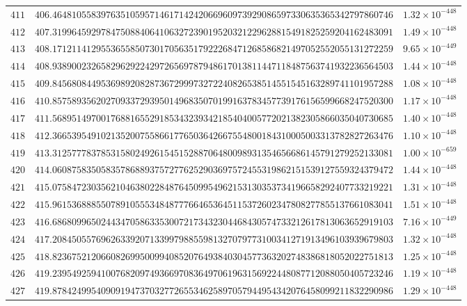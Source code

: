 \documentclass[12pt,reqno]{amsart}
\theoremstyle{remark}
\begin{document}
\begin{longtable}{clc}
$411$ & $406.4648105583976351059571461714242066960973929086597330635365342797860746$ & $1.32\times 10^{-448}$ \\
$412$ & $407.3199645929784750884064106327239019520321229628815491825259204162483091$ & $1.49\times 10^{-448}$ \\
$413$ & $408.1712114129553655850730170563517922268471268586821497052552055131272259$ & $9.65\times 10^{-449}$ \\
$414$ & $408.9389002326582962922429726569787948617013811447118487563741932236564503$ & $1.44\times 10^{-448}$ \\
$415$ & $409.8456808449536989208287367299973272240826538514551545163289741101957288$ & $1.08\times 10^{-448}$ \\
$416$ & $410.8575893562027093372939501496835070199163783457739176156599668247520300$ & $1.17\times 10^{-448}$ \\
$417$ & $411.5689514970017688165529185343239342185404005772021382305866035040730685$ & $1.40\times 10^{-448}$ \\
$418$ & $412.3665395491021352007558661776503642667554800184310005003313782827263476$ & $1.10\times 10^{-448}$ \\
$419$ & $413.3125777837853158024926154515288706480098931354656686145791279252133081$ & $1.00\times 10^{-659}$ \\
$420$ & $414.0608758350583578688937572776252903697572455319862151539127559324379472$ & $1.44\times 10^{-448}$ \\
$421$ & $415.0758472303562104638022848764509954962153130353734196658292407733219221$ & $1.31\times 10^{-448}$ \\
$422$ & $415.9615368885507891055534848777664653645115372602347808277855137661083041$ & $1.51\times 10^{-448}$ \\
$423$ & $416.6868099650244347058633530072173432304468430574733212617813063652919103$ & $7.16\times 10^{-449}$ \\
$424$ & $417.2084505576962633920713399798855981327079773100341271913496103939679803$ & $1.32\times 10^{-448}$ \\
$425$ & $418.8236752120660826995009940852076493840304577363202748386818052022751813$ & $1.25\times 10^{-448}$ \\
$426$ & $419.2395492594100768209749366970836497061963156922448087712088050405723246$ & $1.19\times 10^{-448}$ \\
$427$ & $419.8784249954090919473703277265534625897057944954342076458099211832290986$ & $1.29\times 10^{-448}$ \\

\end{longtable}
\end{document}
